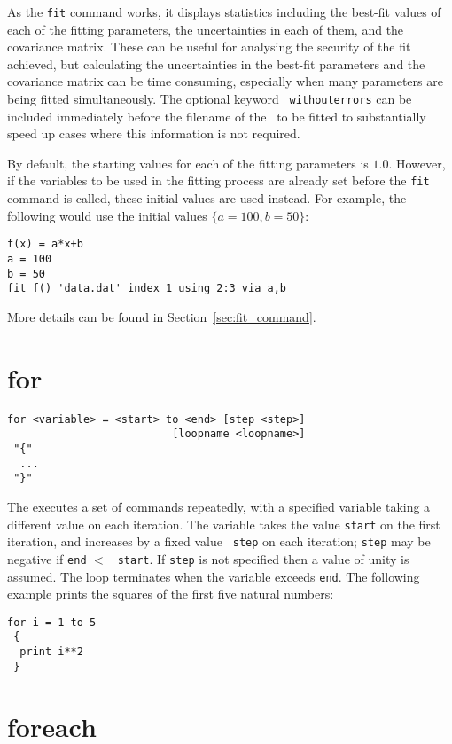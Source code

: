 As the {\tt fit} command works, it displays statistics including the best-fit
values of each of the fitting parameters, the uncertainties in each of them,
and the covariance matrix. These can be useful for analysing the security of
the fit achieved, but calculating the uncertainties in the best-fit parameters
and the covariance matrix can be time consuming, especially when many
parameters are being fitted simultaneously. The optional keyword {\tt
withouterrors} can be included immediately before the filename of the
\datafile\ to be fitted to substantially speed up cases where this information
is not required.

By default, the starting values for each of the fitting parameters is
$1.0$. However, if the variables to be used in the fitting process are already
set before the {\tt fit} command is called, these initial values are used
instead. For example, the following would use the initial values
$\{a=100,b=50\}$:
\begin{verbatim}
f(x) = a*x+b
a = 100
b = 50
fit f() 'data.dat' index 1 using 2:3 via a,b
\end{verbatim}

More details can be found in Section~\ref{sec:fit_command}.


\section{for}

\begin{verbatim}
for <variable> = <start> to <end> [step <step>]
                          [loopname <loopname>]
 "{"
  ...
 "}"
\end{verbatim}

The  executes a set of commands repeatedly, with a specified
variable taking a different value on each iteration. The variable takes the
value {\tt start} on the first iteration, and increases by a fixed value {\tt
step} on each iteration; {\tt step} may be negative if {\tt end} $<$ {\tt
start}. If {\tt step} is not specified then a value of unity is assumed. The
loop terminates when the variable exceeds {\tt end}.  The following example
prints the squares of the first five natural numbers:

\begin{verbatim}
for i = 1 to 5
 {
  print i**2
 }
\end{verbatim}


\section{foreach}

